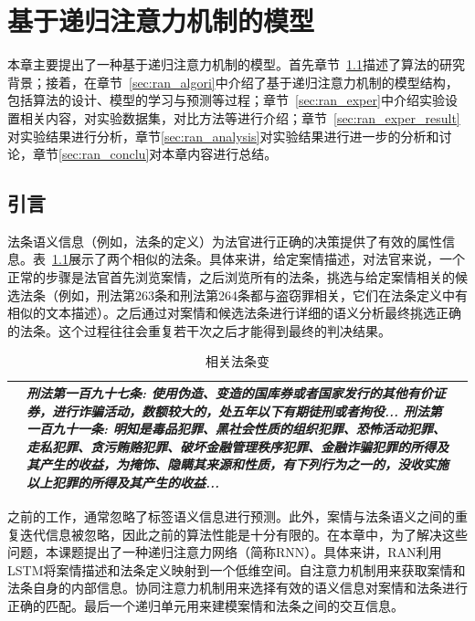 
\chapter{基于递归注意力机制的模型}
本章主要提出了一种基于递归注意力机制的模型。首先章节~\ref{sec:ran_intro}描述了算法的研究背景；接着，在章节~\ref{sec:ran_algori}中介绍了基于递归注意力机制的模型结构，包括算法的设计、模型的学习与预测等过程；章节~\ref{sec:ran_exper}中介绍实验设置相关内容，对实验数据集，对比方法等进行介绍；章节~\ref{sec:ran_exper_result}对实验结果进行分析，章节\ref{sec:ran_analysis}对实验结果进行进一步的分析和讨论，章节\ref{sec:ran_conclu}对本章内容进行总结。

\section{引言}
\label{sec:ran_intro}
法条语义信息（例如，法条的定义）为法官进行正确的决策提供了有效的属性信息。表~\ref{t:similar_article}展示了两个相似的法条。具体来讲，给定案情描述，对法官来说，一个正常的步骤是法官首先浏览案情，之后浏览所有的法条，挑选与给定案情相关的候选法条（例如，刑法第263条和刑法第264条都与盗窃罪相关，它们在法条定义中有相似的文本描述）。之后通过对案情和候选法条进行详细的语义分析最终挑选正确的法条。这个过程往往会重复若干次之后才能得到最终的判决结果。

\begin{table}[htb]
    \caption{相关法条变}
    \label{t:similar_article}
    \centering
    \begin{tabular}{lp{12cm}p{7cm}}
    \hline
    &\emph{\textbf{刑法第一百九十七条}: 使用伪造、变造的国库券或者国家发行的其他有价证券，进行\emph{\textbf{诈骗}}活动，数额较大的，处五年以下有期徒刑或者拘役... \newline
    \textbf{刑法第一百九十一条}: 明知是毒品犯罪、黑社会性质的组织犯罪、恐怖活动犯罪、走私犯罪、贪污贿赂犯罪、破坏金融管理秩序犯罪、\emph{\textbf{金融诈骗}}犯罪的所得及其产生的收益，为掩饰、隐瞒其来源和性质，有下列行为之一的，没收实施以上犯罪的所得及其产生的收益...}\\
    \hline
    \end{tabular}
\end{table}

之前的工作，通常忽略了标签语义信息进行预测。此外，案情与法条语义之间的重复迭代信息被忽略，因此之前的算法性能是十分有限的。在本章中，为了解决这些问题，本课题提出了一种递归注意力网络（简称RNN）。具体来讲，RAN利用LSTM将案情描述和法条定义映射到一个低维空间。自注意力机制用来获取案情和法条自身的内部信息。协同注意力机制用来选择有效的语义信息对案情和法条进行正确的匹配。最后一个递归单元用来建模案情和法条之间的交互信息。

